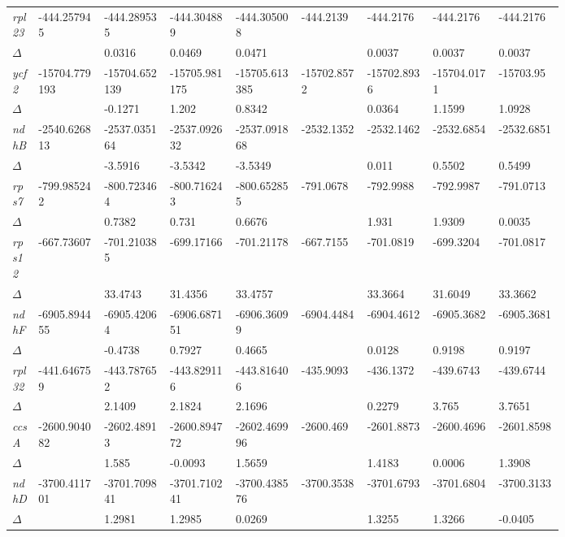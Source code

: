 \documentclass[a4paper]{article}
\begin{document}
\begin{longtable}{p{0.03\linewidth}|p{0.095\linewidth}p{0.095\linewidth}p{0.095\linewidth}p{0.095\linewidth}|p{0.095\linewidth}p{0.095\linewidth}p{0.095\linewidth}p{0.095\linewidth}}
\textit{rpl23} & -444.257945 & -444.289535 & -444.304889 & -444.305008 & -444.2139 & -444.2176 & -444.2176 & -444.2176\\
$\Delta$ &  & 0.0316 & 0.0469 & 0.0471 &  & 0.0037 & 0.0037 & 0.0037\\
 \rowcolor{black!20} \textit{ycf2} & -15704.779193 & -15704.652139 & -15705.981175 & -15705.613385 & -15702.8572 & -15702.8936 & -15704.0171 & -15703.95\\
 \rowcolor{black!20} $\Delta$ &  & -0.1271 & 1.202 & 0.8342 &  & 0.0364 & 1.1599 & 1.0928\\
\textit{ndhB} & -2540.626813 & -2537.035164 & -2537.092632 & -2537.091868 & -2532.1352 & -2532.1462 & -2532.6854 & -2532.6851\\
$\Delta$ &  & -3.5916 & -3.5342 & -3.5349 &  & 0.011 & 0.5502 & 0.5499\\
 \rowcolor{black!20} \textit{rps7} & -799.985242 & -800.723464 & -800.716243 & -800.652855 & -791.0678 & -792.9988 & -792.9987 & -791.0713\\
 \rowcolor{black!20} $\Delta$ &  & 0.7382 & 0.731 & 0.6676 &  & 1.931 & 1.9309 & 0.0035\\
\textit{rps12} & -667.73607 & -701.210385 & -699.17166 & -701.21178 & -667.7155 & -701.0819 & -699.3204 & -701.0817\\
$\Delta$ &  & 33.4743 & 31.4356 & 33.4757 &  & 33.3664 & 31.6049 & 33.3662\\
 \rowcolor{black!20} \textit{ndhF} & -6905.894455 & -6905.42064 & -6906.687151 & -6906.36099 & -6904.4484 & -6904.4612 & -6905.3682 & -6905.3681\\
 \rowcolor{black!20} $\Delta$ &  & -0.4738 & 0.7927 & 0.4665 &  & 0.0128 & 0.9198 & 0.9197\\
\textit{rpl32} & -441.646759 & -443.787652 & -443.829116 & -443.816406 & -435.9093 & -436.1372 & -439.6743 & -439.6744\\
$\Delta$ &  & 2.1409 & 2.1824 & 2.1696 &  & 0.2279 & 3.765 & 3.7651\\
 \rowcolor{black!20} \textit{ccsA} & -2600.904082 & -2602.48913 & -2600.894772 & -2602.469996 & -2600.469 & -2601.8873 & -2600.4696 & -2601.8598\\
 \rowcolor{black!20} $\Delta$ &  & 1.585 & -0.0093 & 1.5659 &  & 1.4183 & 0.0006 & 1.3908\\
\textit{ndhD} & -3700.411701 & -3701.709841 & -3701.710241 & -3700.438576 & -3700.3538 & -3701.6793 & -3701.6804 & -3700.3133\\
$\Delta$ &  & 1.2981 & 1.2985 & 0.0269 &  & 1.3255 & 1.3266 & -0.0405\\

\end{longtable}
\end{document}
